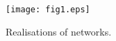\documentclass[10pt]{article}
\begin{document}
\begin{figure}[t]
  \begin{center}
    \texttt{[image: fig1.eps]}
    \caption{\label{fig:realisations} Realisations of networks.}
  \end{center}
\end{figure}
\end{document}
